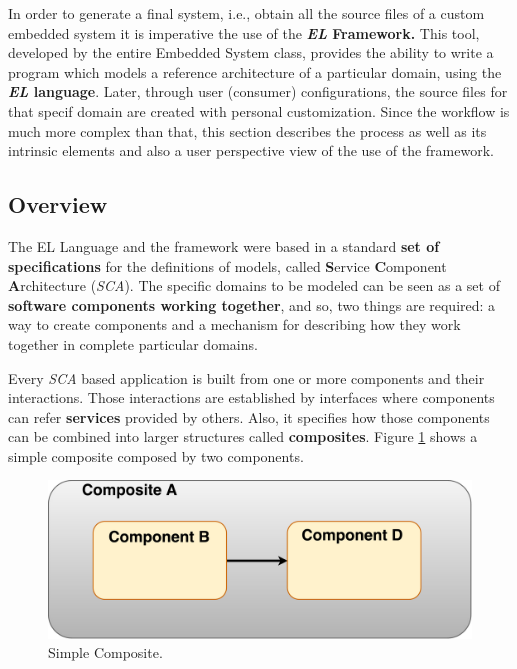 
In order to generate a final system, i.e., obtain all the source files of a custom embedded system it is imperative the use of the \textbf{\textit{EL} Framework.} This tool, developed by the entire Embedded System class, provides the ability to write a program which models a reference architecture of a particular domain, using the \textbf{\textit{EL} language}. Later, through user (consumer) configurations, the source files for that specif domain are created with personal customization. Since the workflow is much more complex than that, this section describes the process as well as its intrinsic elements and also a user perspective view of the use of the framework.

\subsection{Overview}

The EL Language and the framework were based in a standard \textbf{set of specifications} for the definitions of models, called  \textbf{S}ervice \textbf{C}omponent \textbf{A}rchitecture (\textit{SCA}). The specific domains to be modeled can be seen as a set of \textbf{software components working together}, and so, two things are required: a way to create components and a mechanism for describing how they work together in complete particular domains. 
 
Every \textit{SCA} based application is built from one or more components and their interactions. Those interactions are established by interfaces where components can refer \textbf{services} provided by others. Also, it specifies how those components can be combined into larger structures called \textbf{composites}. Figure \ref{fig:CompositeModel} shows a simple composite composed by two components.

 \begin{figure}[!htb]
\centering
\includegraphics[scale=0.25]{images/CompositeModel}
\caption{Simple Composite.}
\label{fig:CompositeModel} 
\end{figure}
 

